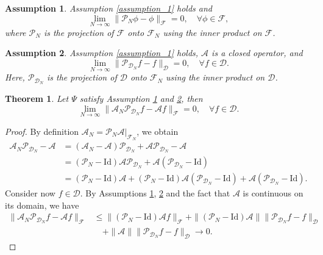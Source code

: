 \documentclass{article}[11]
\newtheorem{theorem}{Theorem}
\newtheorem{assumption}{Assumption}
\begin{document}
\begin{assumption}\label{assumption_2}
	Assumption \ref{assumption_1} holds and
	\[
	\lim_{N \to \infty} \| \mathcal{P}_N \phi - \phi \|_{\mathcal{F}} = 0, \quad \forall \phi \in \mathcal{F},
	\]
	where $\mathcal{P}_N$ is the projection of $\mathcal{F}$ onto $\mathcal{F}_N$ using the inner product on $\mathcal{F}$.	
\end{assumption}

\begin{assumption}\label{assumption_3}
	Assumption \ref{assumption_1} holds, $\mathcal{A}$ is a closed operator, and
	\[
	\lim_{N \to \infty} \| \mathcal{P}_{\mathcal{D}_N} f - f \|_{\mathcal{D}} = 0, \quad \forall f \in \mathcal{D}.
	\]
	Here, $\mathcal{P}_{\mathcal{D}_N}$ is the projection of $\mathcal{D}$ onto $\mathcal{F}_N$ using the inner product on $\mathcal{D}$.
\end{assumption}

\begin{theorem}
	Let $\Psi$ satisfy Assumption \ref{assumption_2} and \ref{assumption_3}, then
	\[
	\lim_{N \to \infty} \| \mathcal{A}_N \mathcal{P}_{\mathcal{D}_N} f - \mathcal{A} f \|_{\mathcal{F}} = 0, \quad \forall f \in \mathcal{D}.
	\]
\end{theorem}

\begin{proof}
	By definition $\mathcal{A}_N = \mathcal{P}_N \mathcal{A} |_{\mathcal{F}_N}$, we obtain
	\begin{align*}
		\mathcal{A}_N \mathcal{P}_{\mathcal{D}_N} - \mathcal{A} &= (\mathcal{A}_N - \mathcal{A}) \mathcal{P}_{\mathcal{D}_N} + \mathcal{A} \mathcal{P}_{\mathcal{D}_N} - \mathcal{A} \\
		&= (\mathcal{P}_N - \mathrm{Id}) \mathcal{A} \mathcal{P}_{\mathcal{D}_N} + \mathcal{A} (\mathcal{P}_{\mathcal{D}_N} - \mathrm{Id}) \\
		&= (\mathcal{P}_N - \mathrm{Id}) \mathcal{A} + (\mathcal{P}_N - \mathrm{Id}) \mathcal{A} (\mathcal{P}_{\mathcal{D}_N} - \mathrm{Id}) + \mathcal{A} (\mathcal{P}_{\mathcal{D}_N} - \mathrm{Id}).
	\end{align*}	
	Consider now $f \in \mathcal{D}$. By Assumptions \ref{assumption_2}, \ref{assumption_3} and the fact that $\mathcal{A}$ is continuous on its domain, we have
	\begin{align*}
		\| \mathcal{A}_N \mathcal{P}_{\mathcal{D}_N} f - \mathcal{A} f \|_{\mathcal{F}} &\leq \| (\mathcal{P}_N - \mathrm{Id}) \mathcal{A} f \|_{\mathcal{F}} + \| (\mathcal{P}_N - \mathrm{Id}) \mathcal{A} \| \| \mathcal{P}_{\mathcal{D}_N} f - f \|_{\mathcal{D}} \\
		&\quad + \| \mathcal{A} \| \| \mathcal{P}_{\mathcal{D}_N} f - f \|_{\mathcal{D}} \to 0.
	\end{align*}	
\end{proof}
\end{document}
